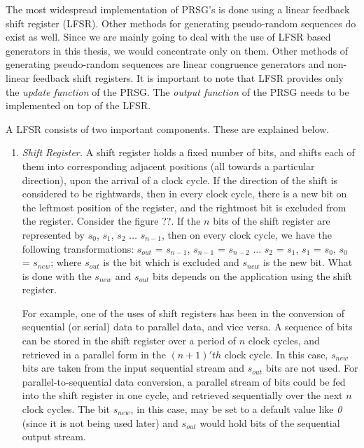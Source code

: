 The most widespread implementation of PRSG's is done using a linear feedback shift register (LFSR). Other methods for generating pseudo-random sequences do exist as well. Since we are mainly going to deal with the use of LFSR based generators in this thesis, we would concentrate only on them. Other methods of generating pseudo-random sequences are linear congruence generators and non-linear feedback shift registers. It is important to note that LFSR provides only the \emph{update function} of the PRSG. The \emph{output function} of the PRSG needs to be implemented on top of the LFSR.

A LFSR consists of two important components. These are explained below. 
\begin{enumerate}

\item \emph{Shift Register.} A shift register holds a fixed number of bits, and shifts each of them into corresponding adjacent positions (all towards a particular direction), upon the arrival of a clock cycle. If the direction of the shift is considered to be rightwards, then in every clock cycle, there is a new bit on the leftmost position of the register, and the rightmost bit is excluded from the register. Consider the figure ??.  If the $n$ bits of the shift register are represented by $s_0$, $s_1$, $s_2$ $\ldots$ $s_{n-1}$, then on every clock cycle, we have the following transformations: $s_{out}$ = $s_{n-1}$, $s_{n-1}$ = $s_{n-2}$ $\ldots$ $s_2$ = $s_1$, $s_1$ = $s_0$, $s_0$ = $s_{new}$; where $s_{out}$ is the bit which is excluded and $s_{new}$ is the new bit. What is done with the $s_{new}$ and $s_{out}$ bits depends on the application using the shift register. 

For example, one of the uses of shift registers has been in the conversion of sequential (or serial) data to parallel data, and vice versa. A sequence of bits can be stored in the shift register over a period of $n$ clock cycles, and retrieved in a parallel form in the $(n+1)'th$ clock cycle. In this case, $s_{new}$ bits are taken from the input sequential stream and $s_{out}$ bits are not used. For parallel-to-sequential data conversion, a parallel stream of bits could be fed into the shift register in one cycle, and retrieved sequentially over the next $n$ clock cycles. The bit $s_{new}$, in this case, may be set to a default value like \emph{0} (since it is not being used later) and $s_{out}$ would hold bits of the sequential output stream. 


\end{enumerate}
